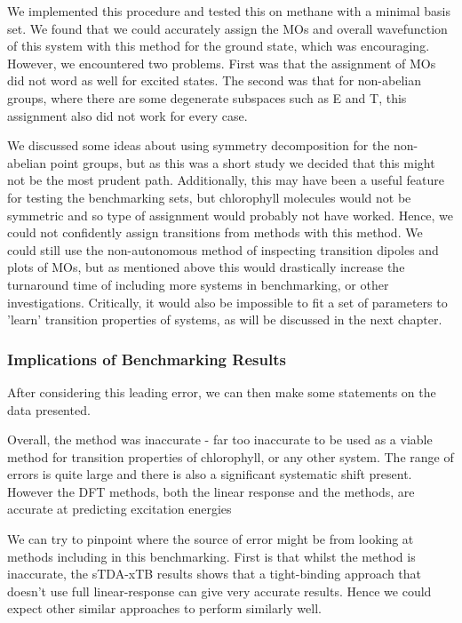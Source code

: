 We implemented this procedure and tested this on methane with a minimal basis set.
We found that we could accurately assign the MOs and overall wavefunction of this
system with this method for the ground state, which was encouraging.
However, we encountered two problems. First was that the assignment of MOs did not
word as well for excited states.
The second was that for non-abelian groups, where there are some degenerate subspaces
such as E and T, this assignment also did not work for every case.

We discussed some ideas about using symmetry decomposition for the non-abelian 
point groups, but as this was a short study we decided that this might not be the
most prudent path. Additionally, this may have been a useful feature for testing
the benchmarking sets, but chlorophyll molecules would not be symmetric and so
type of assignment would probably not have worked. 
Hence, we could not confidently assign transitions from \dscf methods with this method.
We could still use the non-autonomous method of inspecting transition dipoles and
plots of MOs, but as mentioned above this would drastically increase the turnaround
time of including more systems in benchmarking, or other investigations.
Critically, it would also be impossible to fit a set of parameters to 'learn' transition
properties of systems, as will be discussed in the next chapter.

\subsubsection{Implications of Benchmarking Results}
\label{subsubsec:imp_of_benchmarking}

After considering this leading error, we can then make some statements on the
data presented.

Overall, the \dxtb method was inaccurate - far too inaccurate to be used as a 
viable method for transition properties of chlorophyll, or any other system.
The range of errors is quite large and there is also a significant systematic shift 
present. However the DFT methods, both the linear response and the \dscf methods,
are accurate at predicting excitation energies

We can try to pinpoint where the source of error might be from looking at methods
including in this benchmarking. First is that whilst the \dxtb method is inaccurate,
the sTDA-xTB results shows that a tight-binding approach that doesn't use full
linear-response can give very accurate results. Hence we could expect other similar
approaches to perform similarly well.

